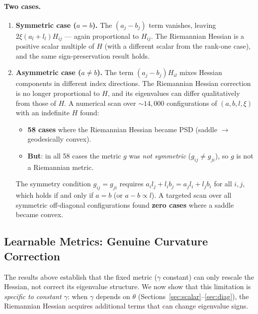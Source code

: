 \documentclass{article}
\begin{document}
\paragraph{Two cases.}
\begin{enumerate}[leftmargin=1.8em]
    \item \textbf{Symmetric case ($a=b$).}
    The $(a_j - b_j)$ term vanishes, leaving
    $2\xi(a_l+l_l)H_{ij}$ --- again proportional to $H_{ij}$.
    The Riemannian Hessian is a positive scalar multiple of $H$
    (with a different scalar from the rank-one case),
    and the same sign-preservation result holds.

    \item \textbf{Asymmetric case ($a\neq b$).}
    The term $(a_j-b_j)H_{il}$ mixes Hessian components in
    different index directions.
    The Riemannian Hessian correction is no longer proportional to $H$,
    and its eigenvalues can differ qualitatively from those of $H$.
    A numerical scan over $\sim\!14{,}000$ configurations of
    $(a,b,l,\xi)$ with an indefinite $H$ found:
    \begin{itemize}
        \item \textbf{58 cases} where the Riemannian Hessian became PSD
              (saddle $\to$ geodesically convex).
        \item \textbf{But}: in all 58 cases the metric $g$ was \emph{not symmetric}
              ($g_{ij}\neq g_{ji}$), so $g$ is not a Riemannian metric.
    \end{itemize}
    The symmetry condition $g_{ij}=g_{ji}$ requires
    $a_i l_j + l_i b_j = a_j l_i + l_j b_i$ for all $i,j$,
    which holds if and only if $a=b$ (or $a-b \propto l$).
    A targeted scan over all symmetric off-diagonal configurations
    found \textbf{zero cases} where a saddle became convex.
\end{enumerate}

\subsection{Learnable Metrics: Genuine Curvature Correction}\label{sec:geodesic-learnable}

The results above establish that the fixed metric ($\gamma$ constant)
can only rescale the Hessian, not correct its eigenvalue structure.
We now show that this limitation is \emph{specific to constant $\gamma$}:
when $\gamma$ depends on $\theta$
(Sections~\ref{sec:scalar}--\ref{sec:diag}),
the Riemannian Hessian acquires additional terms
that can change eigenvalue signs.
\end{document}
